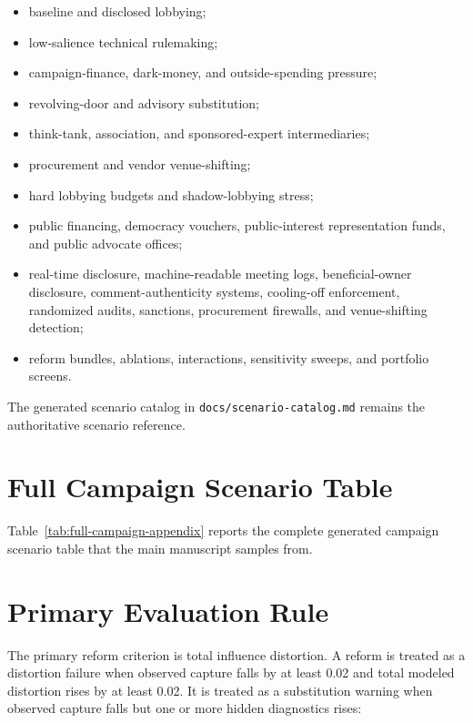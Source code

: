 \begin{itemize}
  \item baseline and disclosed lobbying;
  \item low-salience technical rulemaking;
  \item campaign-finance, dark-money, and outside-spending pressure;
  \item revolving-door and advisory substitution;
  \item think-tank, association, and sponsored-expert intermediaries;
  \item procurement and vendor venue-shifting;
  \item hard lobbying budgets and shadow-lobbying stress;
  \item public financing, democracy vouchers, public-interest representation funds, and public advocate offices;
  \item real-time disclosure, machine-readable meeting logs, beneficial-owner disclosure, comment-authenticity systems, cooling-off enforcement, randomized audits, sanctions, procurement firewalls, and venue-shifting detection;
  \item reform bundles, ablations, interactions, sensitivity sweeps, and portfolio screens.
\end{itemize}

The generated scenario catalog in \texttt{docs/scenario-catalog.md} remains the authoritative scenario reference.

\section{Full Campaign Scenario Table}

Table~\ref{tab:full-campaign-appendix} reports the complete generated campaign scenario table that the main manuscript samples from.



\section{Primary Evaluation Rule}

The primary reform criterion is total influence distortion. A reform is treated as a distortion failure when observed capture falls by at least 0.02 and total modeled distortion rises by at least 0.02. It is treated as a substitution warning when observed capture falls but one or more hidden diagnostics rises:

